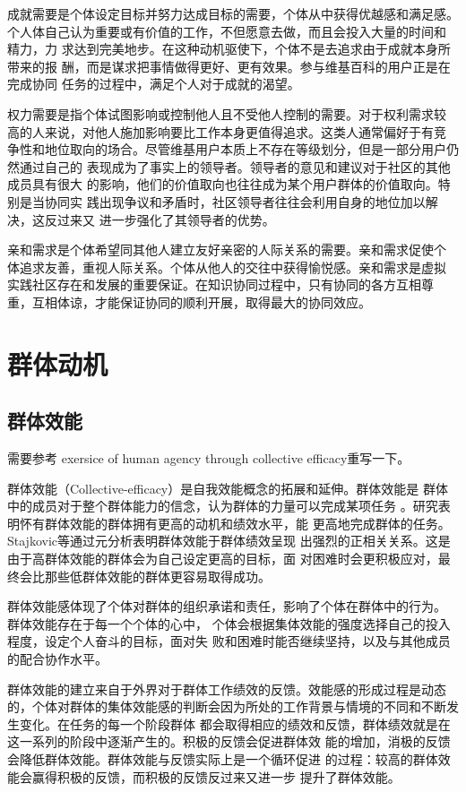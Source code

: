成就需要是个体设定目标并努力达成目标的需要，个体从中获得优越感和满足感。
个人体自己认为重要或有价值的工作，不但愿意去做，而且会投入大量的时间和
精力，力
求达到完美地步。在这种动机驱使下，个体不是去追求由于成就本身所带来的报
酬，而是谋求把事情做得更好、更有效果。参与维基百科的用户正是在完成协同
任务的过程中，满足个人对于成就的渴望。

权力需要是指个体试图影响或控制他人且不受他人控制的需要。对于权利需求较
高的人来说，对他人施加影响要比工作本身更值得追求。这类人通常偏好于有竞
争性和地位取向的场合。尽管维基用户本质上不存在等级划分，但是一部分用户仍然通过自己的
表现成为了事实上的领导者。领导者的意见和建议对于社区的其他成员具有很大
的影响，他们的价值取向也往往成为某个用户群体的价值取向。特别是当协同实
践出现争议和矛盾时，社区领导者往往会利用自身的地位加以解决，这反过来又
进一步强化了其领导者的优势。

亲和需求是个体希望同其他人建立友好亲密的人际关系的需要。亲和需求促使个
体追求友善，重视人际关系。个体从他人的交往中获得愉悦感。亲和需求是虚拟
实践社区存在和发展的重要保证。在知识协同过程中，只有协同的各方互相尊
重，互相体谅，才能保证协同的顺利开展，取得最大的协同效应。

\section{群体动机}
\label{sec:groupe-motivation}

\subsection{群体效能}
\label{sec:collective-efficacy}
需要参考 exersice of human agency through collective efficacy重写一下。

群体效能（Collective-efficacy）是自我效能概念的拓展和延伸。群体效能是
群体中的成员对于整个群体能力的信念，认为群体的力量可以完成某项任务
\cite{bundura}。研究表明怀有群体效能的群体拥有更高的动机和绩效水平，能
更高地完成群体的任务。Stajkovic等通过元分析表明群体效能于群体绩效呈现
出强烈的正相关关系。这是由于高群体效能的群体会为自己设定更高的目标，面
对困难时会更积极应对，最终会比那些低群体效能的群体更容易取得成功。

群体效能感体现了个体对群体的组织承诺和责任，影响了个体在群体中的行为。
群体效能存在于每一个个体的心中，
个体会根据集体效能的强度选择自己的投入程度，设定个人奋斗的目标，面对失
败和困难时能否继续坚持，以及与其他成员的配合协作水平。

群体效能的建立来自于外界对于群体工作绩效的反馈。效能感的形成过程是动态
的，个体对群体的集体效能感的判断会因为所处的工作背景与情境的不同和不断发生变化。在任务的每一个阶段群体
都会取得相应的绩效和反馈，群体绩效就是在这一系列的阶段中逐渐产生的。积极的反馈会促进群体效
能的增加，消极的反馈会降低群体效能。群体效能与反馈实际上是一个循环促进
的过程：较高的群体效能会赢得积极的反馈，而积极的反馈反过来又进一步
提升了群体效能\cite{(Gist}。

